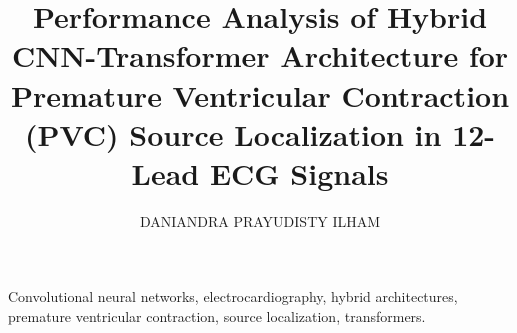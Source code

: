 \documentclass{ieeeaccess}
\begin{document}
\title{Performance Analysis of Hybrid CNN-Transformer Architecture for Premature Ventricular Contraction (PVC) Source Localization in 12-Lead ECG Signals}
\author{\uppercase{Daniandra Prayudisty Ilham}}
\address[1]{School of Computing, Telkom University, Bandung, Indonesia (English affiliation wording pending confirmation)}
\begin{abstract}

\end{abstract}
\begin{keywords}
Convolutional neural networks, electrocardiography, hybrid architectures, premature ventricular contraction, source localization, transformers.
\end{keywords}
\titlepgskip=-21pt
\maketitle











\EOD
\end{document}
